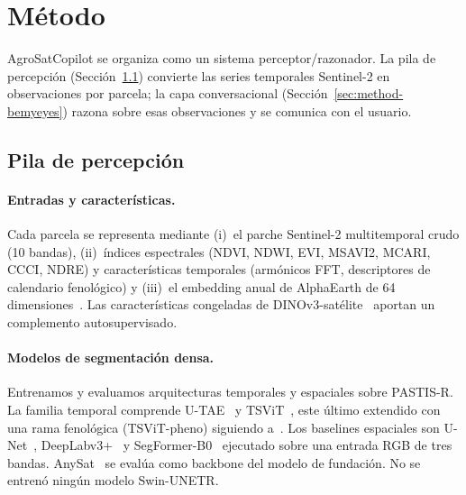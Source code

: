 \section{Método}
\label{sec:method}

AgroSatCopilot se organiza como un sistema perceptor/razonador. La pila
de percepción (Sección~\ref{sec:method-perception}) convierte las series
temporales Sentinel-2 en observaciones por parcela; la capa
conversacional (Sección~\ref{sec:method-bemyeyes}) razona sobre esas
observaciones y se comunica con el usuario.

\subsection{Pila de percepción}
\label{sec:method-perception}

\paragraph{Entradas y características.}
Cada parcela se representa mediante (i)~el parche Sentinel-2
multitemporal crudo (10 bandas), (ii)~índices espectrales (NDVI, NDWI,
EVI, MSAVI2, MCARI, CCCI, NDRE) y características temporales (armónicos
FFT, descriptores de calendario fenológico) y (iii)~el embedding anual
de AlphaEarth de 64 dimensiones~\cite{brown2025alphaearth}. Las
características congeladas de DINOv3-satélite~\cite{oquab2023dinov3}
aportan un complemento autosupervisado.

\paragraph{Modelos de segmentación densa.}
Entrenamos y evaluamos arquitecturas temporales y espaciales sobre
PASTIS-R. La familia temporal comprende U-TAE~\cite{garnot2021utae} y
TSViT~\cite{tarasiou2023tsvit}, este último extendido con una rama
fenológica (TSViT-pheno) siguiendo a~\cite{wen2025phenology}. Los
baselines espaciales son U-Net~\cite{ronneberger2015unet},
DeepLabv3+~\cite{chen2018deeplabv3plus} y
SegFormer-B0~\cite{xie2021segformer} ejecutado sobre una entrada RGB de
tres bandas. AnySat~\cite{astruc2024anysat} se evalúa como backbone del
modelo de fundación. No se entrenó ningún modelo Swin-UNETR.

